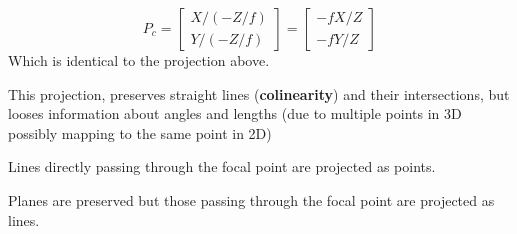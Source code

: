 \documentclass{article}
\begin{document}
{    \begin{equation}
        P_{c} = 
        \begin{bmatrix}
            X / (-Z/f) \\ Y / (-Z/f)
        \end{bmatrix}
        = 
        \begin{bmatrix}
            -fX/Z \\ -fY/Z
        \end{bmatrix}
    \end{equation}
    Which is identical to the projection above.

    This projection, preserves straight lines (\textbf{colinearity}) and their intersections, but looses information about angles and lengths (due to multiple points in 3D possibly mapping to the same point in 2D)
    
    Lines directly passing through the focal point are projected as points.
    
    Planes are preserved but those passing through the focal point are projected as lines.
}


\end{document}
